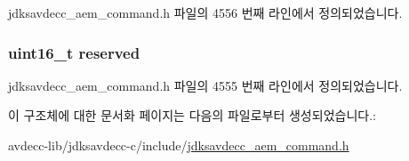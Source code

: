 jdksavdecc\+\_\+aem\+\_\+command.\+h 파일의 4556 번째 라인에서 정의되었습니다.

\subsubsection[{\texorpdfstring{reserved}{reserved}}]{\setlength{\rightskip}{0pt plus 5cm}uint16\+\_\+t reserved}\hypertarget{structjdksavdecc__aem__command__read__descriptor_a5a6ed8c04a3db86066924b1a1bf4dad3}{}\label{structjdksavdecc__aem__command__read__descriptor_a5a6ed8c04a3db86066924b1a1bf4dad3}


jdksavdecc\+\_\+aem\+\_\+command.\+h 파일의 4555 번째 라인에서 정의되었습니다.



이 구조체에 대한 문서화 페이지는 다음의 파일로부터 생성되었습니다.\+:\begin{DoxyCompactItemize}
\item 
avdecc-\/lib/jdksavdecc-\/c/include/\hyperlink{jdksavdecc__aem__command_8h}{jdksavdecc\+\_\+aem\+\_\+command.\+h}\end{DoxyCompactItemize}

